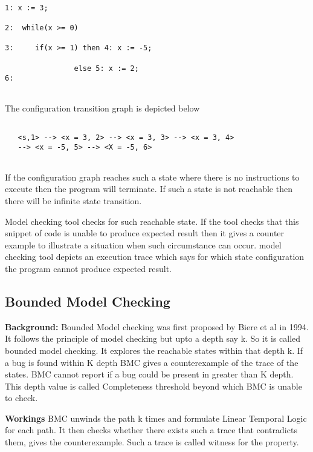 \begin{verbatim}

1: x := 3;
  
2:  while(x >= 0)
   
3:     if(x >= 1) then 4: x := -5;
     
                else 5: x := 2;
6:          
     
\end{verbatim}

The configuration transition graph is depicted below

\begin{verbatim}

   <s,1> --> <x = 3, 2> --> <x = 3, 3> --> <x = 3, 4>
   --> <x = -5, 5> --> <X = -5, 6>
   
\end{verbatim}


If the configuration graph reaches such a state  where there is no instructions
to execute then the program will terminate. If such a state is not reachable 
then there will be infinite state transition.

  Model checking tool checks for such reachable state. If the tool checks that 
  this snippet of code is unable to produce expected result then it gives a 
  counter example to illustrate a situation when such circumstance can occur.
  model checking tool depicts an execution trace which says for which state 
  configuration the program cannot produce expected result.
  
  \subsection{Bounded Model Checking}
  
\textbf{Background:}
Bounded Model checking was first proposed by Biere et al in 1994. It follows
the principle of model checking but upto a depth say k. So it is called bounded
model checking. It explores the reachable states within that depth k. If a bug is
found within K depth BMC gives a counterexample of the trace of the states. BMC
cannot report if a bug could be present in greater than K depth. This depth value
is called Completeness threshold beyond which BMC is unable to check.

\textbf{Workings}
BMC unwinds the path k times and formulate Linear Temporal Logic for each path. 
It then checks whether there exists such a trace that contradicts them, gives 
the counterexample. Such a trace is called witness for the property.

